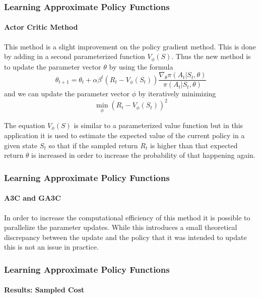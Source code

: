 \documentclass{beamer}
\begin{document}
\begin{frame}
  \frametitle{Learning Approximate Policy Functions}
  \framesubtitle{Actor Critic Method}

  This method is a slight improvement on the policy gradient method. This is done by adding in a second parameterized function $V_{\phi}(S)$. Thus the new method is to update the parameter vector $\theta$ by using the formula
  \begin{equation*}
    \theta_{t+1}=\theta_t+\alpha \beta^t (R_t- V_{\phi}(S_t))\frac{\nabla_\theta\pi(A_t|S_t, \theta)}{\pi(A_t|S_t, \theta)}
  \end{equation*}
  and we can update the parameter vector $\phi$ by iteratively minimizing
  \begin{equation*}
    \min_\phi (R_t - V_{\phi}(S_t))^2
  \end{equation*}

  The equation $V_{\phi}(S)$ is similar to a parameterized value function but in this application it is used to estimate the expected value of the current policy in a given state $S_t$ so that if the sampled return $R_t$ is higher than that expected return $\theta$ is increased in order to increase the probability of that happening again.
\end{frame}


\begin{frame}
  \frametitle{Learning Approximate Policy Functions}
  \framesubtitle{A3C and GA3C}

  In order to increase the computational efficiency of this method it is possible to parallelize the parameter updates. While this introduces a small theoretical discrepancy between the update and the policy that it was intended to update this is not an issue in practice.

  \begin{figure}[H]
    \centering
    \makebox[\textwidth]{\texttt{[image: ga3c]}}
  \end{figure}
\end{frame}


\begin{frame}
  \frametitle{Learning Approximate Policy Functions}
  \framesubtitle{Results: Sampled Cost}

  \begin{figure}[H]
    \centering
  \end{figure}

\end{frame}
\end{document}
